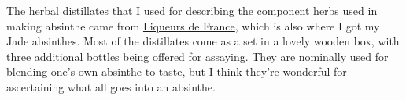 \documentclass[12pt,letterpaper,oneside]{memoir}
\begin{document}
  The herbal distillates that I used for describing the component herbs used in making absinthe came from \href{http://www.absintheonline.com/acatalog/Absinthe_Blending_kit.html}{Liqueurs de France}, which is also where I got my Jade absinthes.  Most of the distillates come as a set in a lovely wooden box, with three additional bottles being offered for assaying.  They are nominally used for blending one's own absinthe to taste, but I think they're wonderful for ascertaining what all goes into an absinthe.
\end{document}
